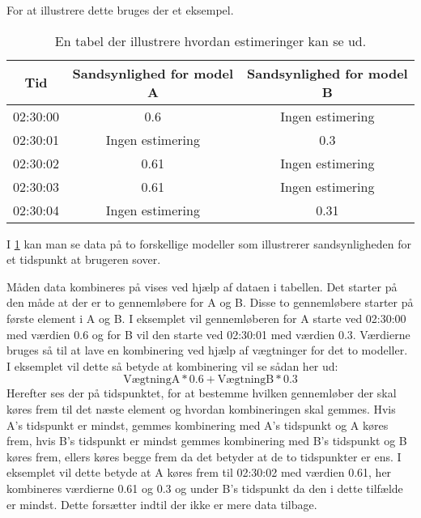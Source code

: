 For at illustrere dette bruges der et eksempel.

\newcommand{\nv}{Ingen estimering}

\begin{table}
\begin{tabular}{|c|c|c|}
\hline Tid & Sandsynlighed for model A & Sandsynlighed for model B \\ 
\hline 02:30:00 & 	0.6     & \nv \\ 
\hline 02:30:01 & 	\nv     & 0.3 \\ 
\hline 02:30:02 & 	0.61    & \nv \\ 
\hline 02:30:03 & 	0.61    & \nv \\ 
\hline 02:30:04 & 	\nv     & 0.31 \\ 
\hline 
\end{tabular} 
\caption{En tabel der illustrere hvordan estimeringer kan se ud.}
\label{tab:combiModelsExample}
\end{table}

I \cref{tab:combiModelsExample} kan man se data på to forskellige modeller som illustrerer sandsynligheden for et tidspunkt at brugeren sover.

Måden data kombineres på vises ved hjælp af dataen i tabellen.
Det starter på den måde at der er to gennemløbere for A og B. 
Disse to gennemløbere starter på første element i A og B. 
I eksemplet vil gennemløberen for A starte ved 02:30:00 med værdien 0.6 og for B vil den starte ved 02:30:01 med værdien 0.3.
Værdierne bruges så til at lave en kombinering ved hjælp af vægtninger for det to modeller. I eksemplet vil dette så betyde at kombinering vil se sådan her ud: $$\text{VægtningA} * 0.6 + \text{VægtningB} * 0.3$$
Herefter ses der på tidspunktet, for at bestemme hvilken gennemløber der skal køres frem til det næste element og hvordan kombineringen skal gemmes.
Hvis A's tidspunkt er mindst, gemmes kombinering med A's tidspunkt og A køres frem, hvis B's tidspunkt er mindst gemmes kombinering med B's tidspunkt og B køres frem, ellers køres begge frem da det betyder at de to tidspunkter er ens.
I eksemplet vil dette betyde at A køres frem til 02:30:02 med værdien 0.61, her kombineres værdierne 0.61 og 0.3 og under B's tidspunkt da den i dette tilfælde er mindst.
Dette forsætter indtil der ikke er mere data tilbage.